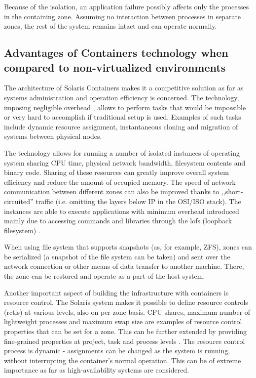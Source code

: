 \documentclass[11pt]{book}
\begin{document}
        Because of the isolation, an application failure possibly affects only the processes in the containing zone.
        Assuming no interaction between processes in separate zones, the rest of the system remains intact and can
        operate normally.
        
      

      \subsection{Advantages of Containers technology when compared to non-virtualized environments}
      \label{sub:}

        The architecture of Solaris Containers makes it a competitive solution as far as systems administration and
        operation efficiency is concerned. The technology, imposing negligible overhead \cite{price}, allows to perform
        tasks that would be impossible or very hard to accomplish if traditional setup is used. Examples of such tasks
        include dynamic resource assignment, instantaneous cloning and migration of systems between physical nodes.

        The technology allows for running a number of isolated instances of operating system sharing CPU time,
        physical network bandwidth, filesystem contents and binary code. Sharing of these resources can greatly improve
        overall system efficiency and reduce the amount of occupied memory. The speed of network communication between
        different zones can also be improved thanks to ,,short-circuited'' traffic (i.e. omitting the layers below IP in
        the OSI/ISO stack). The instances are able to execute applications with minimum overhead introduced mainly due
        to accessing commands and libraries through the lofs (loopback filesystem) \cite{price,fsag}.

        When using file system that supports snapshots (as, for example, ZFS), zones can be
        serialized (a snapshot of the file system can be taken) and sent over the network connection or other means of
        data transfer to another machine. There, the zone can be restored and operate as a part of the host system.

        Another important aspect of building the infrastructure with containers is resource control. The Solaris system
        makes it possible to define resource controls (rctls) at various levels, also on per-zone basis. CPU shares,
        maximum number of lightweight processes and maximum swap size are examples of resource control properties that
        can be set for a zone. This can be further extended by providing fine-grained properties at project, task and
        process levels \cite{sag}. The resource control process is dynamic - assignments can be changed as the system
        is running, without interrupting the container's normal operation. This can be of extreme importance as far
        as high-availability systems are considered.
\end{document}
